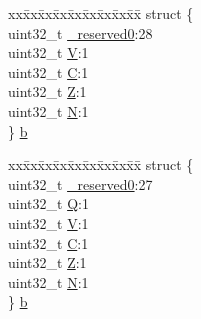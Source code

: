 \begin{DoxyCompactItemize}
\begin{tabbing}
\end{tabbing}\item 
\begin{tabbing}
xx\=xx\=xx\=xx\=xx\=xx\=xx\=xx\=xx\=\kill
struct \{\\
\>uint32\_t \hyperlink{unionAPSR__Type_afbce95646fd514c10aa85ec0a33db728}{\_reserved0}:28\\
\>uint32\_t \hyperlink{unionAPSR__Type_a8004d224aacb78ca37774c35f9156e7e}{V}:1\\
\>uint32\_t \hyperlink{unionAPSR__Type_a86e2c5b891ecef1ab55b1edac0da79a6}{C}:1\\
\>uint32\_t \hyperlink{unionAPSR__Type_a3b04d58738b66a28ff13f23d8b0ba7e5}{Z}:1\\
\>uint32\_t \hyperlink{unionAPSR__Type_a7e7bbba9b00b0bb3283dc07f1abe37e0}{N}:1\\
\} \hyperlink{unionAPSR__Type_af5f6237182ed81f50fd9cf7669c9a581}{b}\\

\end{tabbing}\item 
\begin{tabbing}
xx\=xx\=xx\=xx\=xx\=xx\=xx\=xx\=xx\=\kill
struct \{\\
\>uint32\_t \hyperlink{unionAPSR__Type_afbce95646fd514c10aa85ec0a33db728}{\_reserved0}:27\\
\>uint32\_t \hyperlink{unionAPSR__Type_a22d10913489d24ab08bd83457daa88de}{Q}:1\\
\>uint32\_t \hyperlink{unionAPSR__Type_a8004d224aacb78ca37774c35f9156e7e}{V}:1\\
\>uint32\_t \hyperlink{unionAPSR__Type_a86e2c5b891ecef1ab55b1edac0da79a6}{C}:1\\
\>uint32\_t \hyperlink{unionAPSR__Type_a3b04d58738b66a28ff13f23d8b0ba7e5}{Z}:1\\
\>uint32\_t \hyperlink{unionAPSR__Type_a7e7bbba9b00b0bb3283dc07f1abe37e0}{N}:1\\
\} \hyperlink{unionAPSR__Type_ac5743179302d4d93d913f963b9c1d26b}{b}\\


\end{tabbing}
\end{DoxyCompactItemize}
